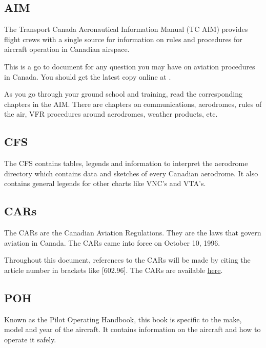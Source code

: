 \documentclass[12pt,letterpaper]{article}
\begin{document}
        \subsection{AIM}
        The Transport Canada Aeronautical Information Manual (TC AIM) provides flight crews with a single source for information on rules and procedures for aircraft operation in Canadian airspace.
            
        This is a go to document for any question you may have on aviation procedures in Canada. You should get the latest copy online at \href{https://tc.canada.ca/en/aviation/publications/transport-canada-aeronautical-information-manual-tc-aim-tp-14371}{\color{cyan}{TP 14371}}.
        
        As you go through your ground school and training, read the corresponding chapters in the AIM. There are chapters on communications, aerodromes, rules of the air, VFR procedures around aerodromes, weather products, etc.

        \subsection{CFS}
        
        The CFS contains tables, legends and information to interpret the aerodrome directory which contains data and sketches of every Canadian aerodrome. It also contains general legends for other charts like VNC's and VTA's.

        \subsection{CARs}
        
        The CARs are the Canadian Aviation Regulations. They are the laws that govern aviation in Canada. The CARs came into force on October 10, 1996.
        
        Throughout this document, references to the CARs will be made by citing the article number in brackets like [602.96]. The CARs are available \href{https://tc.canada.ca/en/corporate-services/acts-regulations/list-regulations/canadian-aviation-regulations-sor-96-433}{\color{cyan}here}.
        
        \subsection{POH}
        
        Known as the Pilot Operating Handbook, this book is specific to the make, model and year of the aircraft. It contains information on the aircraft and how to operate it safely.
        
\end{document}
